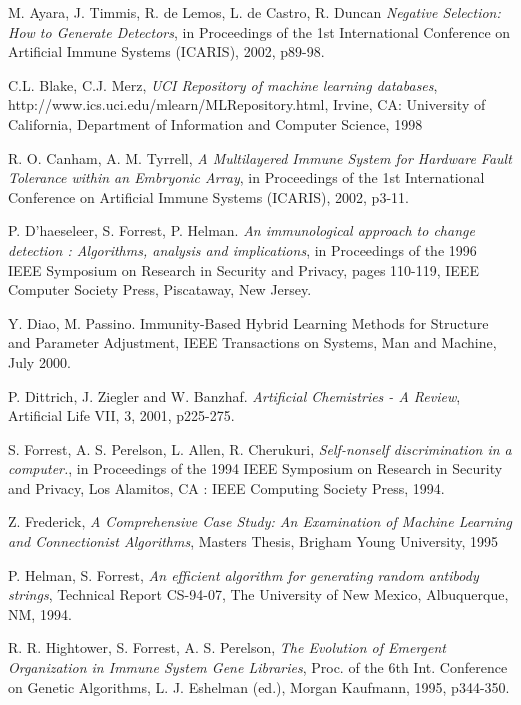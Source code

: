 \documentclass{llncs}
\begin{document}
\begin{thebibliography}{99}

M. Ayara, J. Timmis, R. de Lemos, L. de Castro, R. Duncan {\it Negative Selection: How to Generate Detectors}, in Proceedings of the 1st International Conference on Artificial Immune Systems (ICARIS), 2002, p89-98.

C.L. Blake, C.J. Merz,  {\it UCI Repository of machine learning databases}, http://www.ics.uci.edu/mlearn/MLRepository.html, Irvine, CA: University of California, Department of Information and Computer Science, 1998

R. O. Canham, A. M. Tyrrell, {\it A Multilayered Immune System for Hardware Fault Tolerance within an Embryonic Array}, in Proceedings of the 1st International Conference on Artificial Immune Systems (ICARIS), 2002, p3-11.

P. D'haeseleer, S. Forrest, P. Helman. {\it An immunological approach to change detection : Algorithms, analysis and implications}, in Proceedings of the 1996 IEEE Symposium on Research in Security and Privacy, pages 110-119, IEEE Computer Society Press, Piscataway, New Jersey. 

Y. Diao, M. Passino. {Immunity-Based Hybrid Learning Methods for Structure and Parameter Adjustment}, IEEE Transactions on Systems, Man and Machine, July 2000.

P. Dittrich, J. Ziegler and W. Banzhaf. {\it Artificial Chemistries - A Review}, Artificial Life VII, 3, 2001, p225-275.

S. Forrest, A. S. Perelson, L. Allen, R. Cherukuri, {\it Self-nonself discrimination in a computer.}, in Proceedings of the 1994 IEEE Symposium on Research in Security and Privacy, Los Alamitos, CA : IEEE Computing Society Press, 1994.

Z. Frederick, {\it A Comprehensive Case Study: An Examination of Machine Learning and Connectionist Algorithms}, Masters Thesis, Brigham Young University, 1995

P. Helman, S. Forrest, {\it An efficient algorithm for generating random antibody strings}, Technical Report CS-94-07, The University of New Mexico, Albuquerque, NM, 1994.

R. R. Hightower, S. Forrest, A. S. Perelson, {\it The Evolution of Emergent Organization in Immune System Gene Libraries}, Proc. of the 6th Int. Conference on Genetic Algorithms, L. J. Eshelman (ed.), Morgan Kaufmann, 1995, p344-350.


\end{thebibliography}
\end{document}
